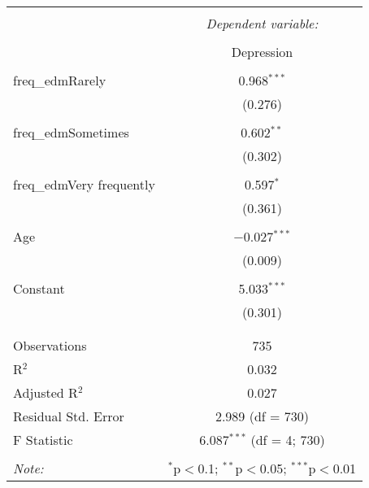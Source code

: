 \documentclass{article}
\begin{document}
\begin{table}[!htbp] \centering 
  \caption{} 
  \label{} 
\begin{tabular}{@{\extracolsep{5pt}}lc} 
\\[-1.8ex]\hline 
\hline \\[-1.8ex] 
 & \multicolumn{1}{c}{\textit{Dependent variable:}} \\ 
\cline{2-2} 
\\[-1.8ex] & Depression \\ 
\hline \\[-1.8ex] 
 freq\_edmRarely & 0.968$^{***}$ \\ 
  & (0.276) \\ 
  & \\ 
 freq\_edmSometimes & 0.602$^{**}$ \\ 
  & (0.302) \\ 
  & \\ 
 freq\_edmVery frequently & 0.597$^{*}$ \\ 
  & (0.361) \\ 
  & \\ 
 Age & $-$0.027$^{***}$ \\ 
  & (0.009) \\ 
  & \\ 
 Constant & 5.033$^{***}$ \\ 
  & (0.301) \\ 
  & \\ 
\hline \\[-1.8ex] 
Observations & 735 \\ 
R$^{2}$ & 0.032 \\ 
Adjusted R$^{2}$ & 0.027 \\ 
Residual Std. Error & 2.989 (df = 730) \\ 
F Statistic & 6.087$^{***}$ (df = 4; 730) \\ 
\hline 
\hline \\[-1.8ex] 
\textit{Note:}  & \multicolumn{1}{r}{$^{*}$p$<$0.1; $^{**}$p$<$0.05; $^{***}$p$<$0.01} \\ 
\end{tabular} 
\end{table} 
\end{document}
